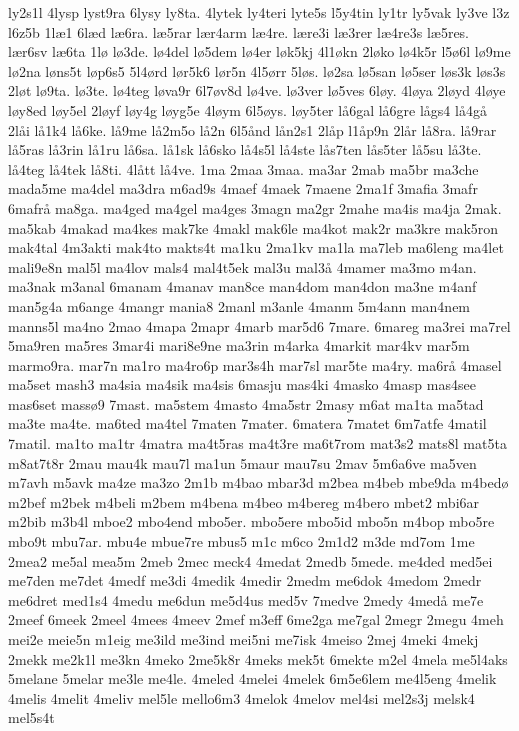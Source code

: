 {ly2s1l
4lysp
lyst9ra
6lysy
ly8ta.
4lytek
ly4teri
lyte5s
l5y4tin
ly1tr
ly5vak
ly3ve
l3z
l6z5b
1læ1
6læd
læ6ra.
læ5rar
lær4arm
læ4re.
lære3i
læ3rer
læ4re3s
læ5res.
lær6sv
læ6ta
1lø
lø3de.
lø4del
lø5dem
lø4er
løk5kj
4l1økn
2løko
lø4k5r
l5ø6l
lø9me
lø2na
løns5t
løp6s5
5l4ørd
lør5k6
lør5n
4l5ørr
5løs.
lø2sa
lø5san
lø5ser
løs3k
løs3s
2løt
lø9ta.
lø3te.
lø4teg
løva9r
6l7øv8d
lø4ve.
lø3ver
lø5ves
6løy.
4løya
2løyd
4løye
løy8ed
løy5el
2løyf
løy4g
løyg5e
4løym
6l5øys.
løy5ter
lå6gal
lå6gre
lågs4
lå4gå
2låi
lå1k4
lå6ke.
lå9me
lå2m5o
lå2n
6l5ånd
lån2s1
2låp
l1åp9n
2lår
lå8ra.
lå9rar
lå5ras
lå3rin
lå1ru
lå6sa.
lå1sk
lå6sko
lå4s5l
lå4ste
lås7ten
lås5ter
lå5su
lå3te.
lå4teg
lå4tek
lå8ti.
4lått
lå4ve.
1ma
2maa
3maa.
ma3ar
2mab
ma5br
ma3che
mada5me
ma4del
ma3dra
m6ad9s
4maef
4maek
7maene
2ma1f
3mafia
3mafr
6mafrå
ma8ga.
ma4ged
ma4gel
ma4ges
3magn
ma2gr
2mahe
ma4is
ma4ja
2mak.
ma5kab
4makad
ma4kes
mak7ke
4makl
mak6le
ma4kot
mak2r
ma3kre
mak5ron
mak4tal
4m3akti
mak4to
makts4t
ma1ku
2ma1kv
ma1la
ma7leb
ma6leng
ma4let
mali9e8n
mal5l
ma4lov
mals4
mal4t5ek
mal3u
mal3å
4mamer
ma3mo
m4an.
ma3nak
m3anal
6manam
4manav
man8ce
man4dom
man4don
ma3ne
m4anf
man5g4a
m6ange
4mangr
mania8
2manl
m3anle
4manm
5m4ann
man4nem
manns5l
ma4no
2mao
4mapa
2mapr
4marb
mar5d6
7mare.
6mareg
ma3rei
ma7rel
5ma9ren
ma5res
3mar4i
mari8e9ne
ma3rin
m4arka
4markit
mar4kv
mar5m
marmo9ra.
mar7n
ma1ro
ma4ro6p
mar3s4h
mar7sl
mar5te
ma4ry.
ma6rå
4masel
ma5set
mash3
ma4sia
ma4sik
ma4sis
6masju
mas4ki
4masko
4masp
mas4see
mas6set
massø9
7mast.
ma5stem
4masto
4ma5str
2masy
m6at
ma1ta
ma5tad
ma3te
ma4te.
ma6ted
ma4tel
7maten
7mater.
6matera
7matet
6m7atfe
4matil
7matil.
ma1to
ma1tr
4matra
ma4t5ras
ma4t3re
ma6t7rom
mat3s2
mats8l
mat5ta
m8at7t8r
2mau
mau4k
mau7l
ma1un
5maur
mau7su
2mav
5m6a6ve
ma5ven
m7avh
m5avk
ma4ze
ma3zo
2m1b
m4bao
mbar3d
m2bea
m4beb
mbe9da
m4bedø
m2bef
m2bek
m4beli
m2bem
m4bena
m4beo
m4bereg
m4bero
mbet2
mbi6ar
m2bib
m3b4l
mboe2
mbo4end
mbo5er.
mbo5ere
mbo5id
mbo5n
m4bop
mbo5re
mbo9t
mbu7ar.
mbu4e
mbue7re
mbus5
m1c
m6co
2m1d2
m3de
md7om
1me
2mea2
me5al
mea5m
2meb
2mec
meck4
4medat
2medb
5mede.
me4ded
med5ei
me7den
me7det
4medf
me3di
4medik
4medir
2medm
me6dok
4medom
2medr
me6dret
med1s4
4medu
me6dun
me5d4us
med5v
7medve
2medy
4medå
me7e
2meef
6meek
2meel
4mees
4meev
2mef
m3eff
6me2ga
me7gal
2megr
2megu
4meh
mei2e
meie5n
m1eig
me3ild
me3ind
mei5ni
me7isk
4meiso
2mej
4meki
4mekj
2mekk
me2k1l
me3kn
4meko
2me5k8r
4meks
mek5t
6mekte
m2el
4mela
me5l4aks
5melane
5melar
me3le
me4le.
4meled
4melei
4melek
6m5e6lem
me4l5eng
4melik
4melis
4melit
4meliv
mel5le
mello6m3
4melok
4melov
mel4si
mel2s3j
melsk4
mel5s4t
}
